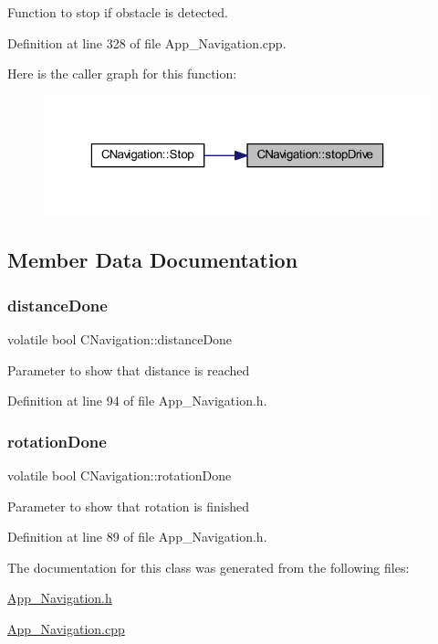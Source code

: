 Function to stop if obstacle is detected. 



Definition at line 328 of file App\+\_\+\+Navigation.\+cpp.

Here is the caller graph for this function\+:
\nopagebreak
\begin{figure}[H]
\begin{center}
\leavevmode
\includegraphics[width=323pt]{class_c_navigation_a06ce71124d487f1f9febf36a0e4b2a5d_icgraph}
\end{center}
\end{figure}


\subsection{Member Data Documentation}
\mbox{\label{class_c_navigation_af3f718b7aa00a149c31c5682113da75e}} 
\subsubsection{\texorpdfstring{distanceDone}{distanceDone}}
{\footnotesize\ttfamily volatile bool C\+Navigation\+::distance\+Done}

Parameter to show that distance is reached 

Definition at line 94 of file App\+\_\+\+Navigation.\+h.

\mbox{\label{class_c_navigation_a069e02947303fed95655cd4ad88a96b7}} 
\subsubsection{\texorpdfstring{rotationDone}{rotationDone}}
{\footnotesize\ttfamily volatile bool C\+Navigation\+::rotation\+Done}

Parameter to show that rotation is finished 

Definition at line 89 of file App\+\_\+\+Navigation.\+h.



The documentation for this class was generated from the following files\+:\begin{DoxyCompactItemize}
\item 
\mbox{\hyperlink{_app___navigation_8h}{App\+\_\+\+Navigation.\+h}}\item 
\mbox{\hyperlink{_app___navigation_8cpp}{App\+\_\+\+Navigation.\+cpp}}\end{DoxyCompactItemize}
